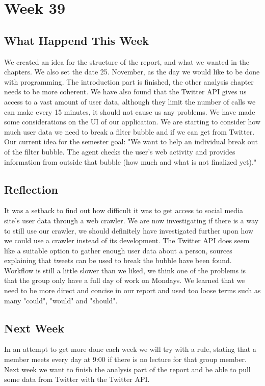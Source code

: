 \section*{Week 39}
\subsection*{What Happend This Week}
We created an idea for the structure of the report, and what we wanted in the
chapters. We also set the date 25. November, as the day we would like to be done
with programming. The introduction part is finished, the other analysis chapter
needs to be more coherent.
We have also found that the Twitter \ac{API} gives us access to a vast amount of
user data, although they limit the number of calls we can make every 15 minutes, it
should not cause us any problems. We have made some considerations on the
\ac{UI} of our application. We are starting to consider how much user data we need to break
a filter bubble and if we can get from Twitter.
Our current idea for the semester goal: "We want to help an individual break out
of the filter bubble. The agent checks the user's web activity and provides
information from outside that bubble (how much and what is not finalized yet)."


\subsection*{Reflection}
It was a setback to find out how difficult it was to
get access to social media site's user data through a web crawler. We are now
investigating if there is a way to still use our crawler, we should definitely
have investigated further upon how we could use a crawler instead of its
development.
The Twitter \ac{API} does seem like a suitable option to gather enough user data
about a person, sources explaining that tweets can be used to break the bubble
have been found. Workflow is still a little slower than we liked, we think one
of the problems is that the group only have a full day of work on Mondays. We
learned that we need to be more direct and concise in our report and used too
loose terms such as many "could", "would" and "should".

\subsection*{Next Week}
In an attempt to get more done each week we will try
with a rule, stating that a member meets every day at 9:00 if there is no
lecture for that group member. Next week we want to finish the analysis part of
the report and be able to pull some data from Twitter with the Twitter \ac{API}.
	


